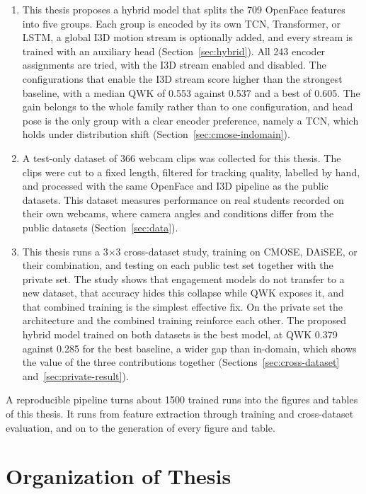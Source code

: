 \documentclass[../main.tex]{subfiles}
\begin{document}
\begin{enumerate}
  \item This thesis proposes a hybrid model that splits the 709 OpenFace features into five groups. Each group is encoded by its own TCN, Transformer, or LSTM, a global I3D motion stream is optionally added, and every stream is trained with an auxiliary head (Section~\ref{sec:hybrid}). All 243 encoder assignments are tried, with the I3D stream enabled and disabled. The configurations that enable the I3D stream score higher than the strongest baseline, with a median QWK of 0.553 against 0.537 and a best of 0.605. The gain belongs to the whole family rather than to one configuration, and head pose is the only group with a clear encoder preference, namely a TCN, which holds under distribution shift (Section~\ref{sec:cmose-indomain}).

  \item A test-only dataset of 366 webcam clips was collected for this thesis. The clips were cut to a fixed length, filtered for tracking quality, labelled by hand, and processed with the same OpenFace and I3D pipeline as the public datasets. This dataset measures performance on real students recorded on their own webcams, where camera angles and conditions differ from the public datasets (Section~\ref{sec:data}).

  \item This thesis runs a 3$\times$3 cross-dataset study, training on CMOSE, DAiSEE, or their combination, and testing on each public test set together with the private set. The study shows that engagement models do not transfer to a new dataset, that accuracy hides this collapse while QWK exposes it, and that combined training is the simplest effective fix. On the private set the architecture and the combined training reinforce each other. The proposed hybrid model trained on both datasets is the best model, at QWK 0.379 against 0.285 for the best baseline, a wider gap than in-domain, which shows the value of the three contributions together (Sections~\ref{sec:cross-dataset} and~\ref{sec:private-result}).
\end{enumerate}

A reproducible pipeline turns about 1500 trained runs into the figures and tables of this thesis. It runs from feature extraction through training and cross-dataset evaluation, and on to the generation of every figure and table.

\FloatBarrier
\section{Organization of Thesis}
\label{sec:organization}
\end{document}
